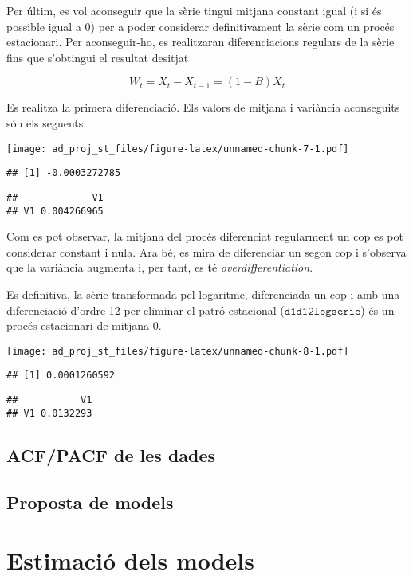 \documentclass[]{article}
\begin{document}
Per últim, es vol aconseguir que la sèrie tingui mitjana constant igual
(i si és possible igual a 0) per a poder considerar definitivament la
sèrie com un procés estacionari. Per aconseguir-ho, es realitzaran
diferenciacions regulars de la sèrie fins que s'obtingui el resultat
desitjat

\[ W_t = X_t - X_{t-1} = (1 - B)X_t \]

Es realitza la primera diferenciació. Els valors de mitjana i variància
aconseguits són els seguents:

\texttt{[image: ad\_proj\_st\_files/figure-latex/unnamed-chunk-7-1.pdf]}

\begin{verbatim}
## [1] -0.0003272785
\end{verbatim}

\begin{verbatim}
##             V1
## V1 0.004266965
\end{verbatim}

Com es pot observar, la mitjana del procés diferenciat regularment un
cop es pot considerar constant i nula. Ara bé, es mira de diferenciar un
segon cop i s'observa que la variància augmenta i, per tant, es té
\emph{overdifferentiation}.

Es definitiva, la sèrie transformada pel logaritme, diferenciada un cop
i amb una diferenciació d'ordre 12 per eliminar el patró estacional
(\(\texttt{d1d12logserie}\)) és un procés estacionari de mitjana 0.

\texttt{[image: ad\_proj\_st\_files/figure-latex/unnamed-chunk-8-1.pdf]}

\begin{verbatim}
## [1] 0.0001260592
\end{verbatim}

\begin{verbatim}
##           V1
## V1 0.0132293
\end{verbatim}

\subsection{ACF/PACF de les dades}\label{acfpacf-de-les-dades}

\subsection{Proposta de models}\label{proposta-de-models}

\section{Estimació dels models}\label{estimacio-dels-models}
\end{document}
